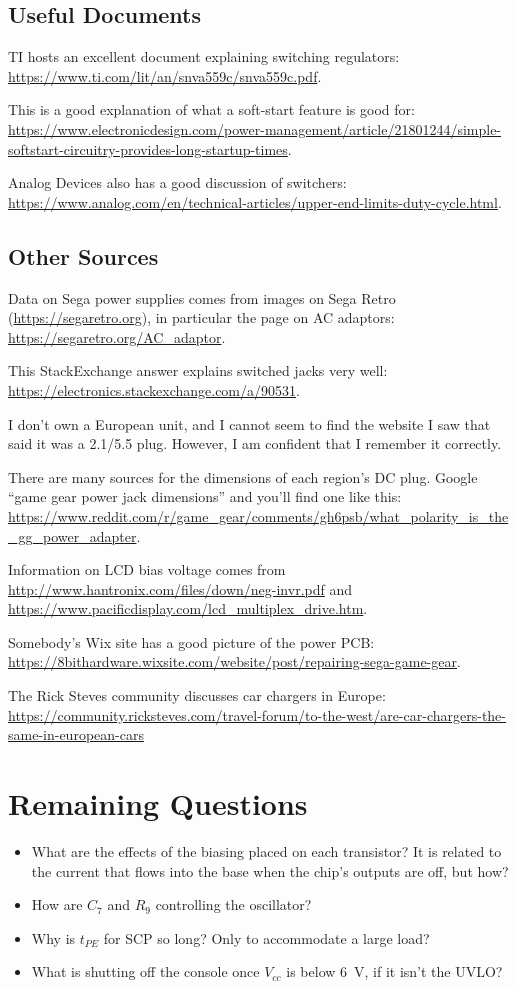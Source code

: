 \documentclass{article}
\newcommand{\Vcc}{$V_{cc}$}
\begin{document}
\subsection{Useful Documents}
TI hosts an excellent document explaining switching regulators:
\url{https://www.ti.com/lit/an/snva559c/snva559c.pdf}.

This is a good explanation of what a soft-start feature is good for:
\url{https://www.electronicdesign.com/power-management/article/21801244/simple-softstart-circuitry-provides-long-startup-times}.

Analog Devices also has a good discussion of switchers:
\url{https://www.analog.com/en/technical-articles/upper-end-limits-duty-cycle.html}.

\subsection{Other Sources}
\label{sec:other_sources}
Data on Sega power supplies comes from images on Sega Retro
(\url{https://segaretro.org}), in particular the page on AC adaptors:
\url{https://segaretro.org/AC_adaptor}.

This Stack\-Ex\-change answer explains switched jacks very well:
\url{https://electronics.stackexchange.com/a/90531}.

I don't own a European unit, and I cannot seem to find the website I
saw that said it was a 2.1/5.5 plug. However, I am confident that I
remember it correctly.

There are many sources for the dimensions of each region's DC
plug. Google ``game gear power jack dimensions'' and you'll find one
like this:
\url{https://www.reddit.com/r/game_gear/comments/gh6psb/what_polarity_is_the_gg_power_adapter}.

Information on LCD bias voltage comes from
\url{http://www.hantronix.com/files/down/neg-invr.pdf} and
\url{https://www.pacificdisplay.com/lcd_multiplex_drive.htm}.

Somebody's Wix site has a good picture of the power PCB:
\url{https://8bithardware.wixsite.com/website/post/repairing-sega-game-gear}.

The Rick Steves community discusses car chargers in Europe:
\url{https://community.ricksteves.com/travel-forum/to-the-west/are-car-chargers-the-same-in-european-cars}
\section{Remaining Questions}
\label{sec:remaining_questions}
\begin{itemize}
\item What are the effects of the biasing placed on each transistor?
  It is related to the current that flows into the base when the
  chip's outputs are off, but how?
\item How are $C_7$ and $R_9$ controlling the oscillator?
\item Why is $t_{PE}$ for SCP so long? Only to accommodate a large
  load?
\item What is shutting off the console once \Vcc{} is below
  \qty{6}{\volt}, if it isn't the UVLO?
\end{itemize}
\end{document}
